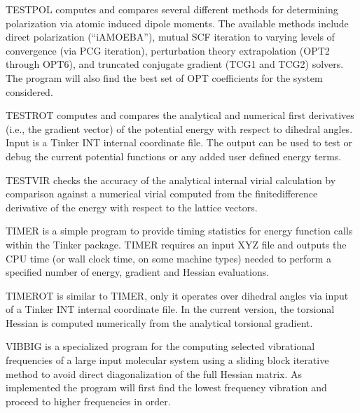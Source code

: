 \documentclass[letterpaper,11pt,english]{sphinxmanual}
\begin{document}
\sphinxAtStartPar
{}

\sphinxAtStartPar
TESTPOL computes and compares several different methods for determining polarization via atomic induced dipole moments. The available methods include direct polarization (“iAMOEBA”), mutual SCF iteration to varying levels of convergence (via PCG iteration), perturbation theory extrapolation (OPT2 through OPT6), and truncated conjugate gradient (TCG1 and TCG2) solvers. The program will also find the best set of OPT coefficients for the system considered.

\sphinxAtStartPar
{}

\sphinxAtStartPar
TESTROT computes and compares the analytical and numerical first derivatives (i.e., the gradient vector) of the potential energy with respect to dihedral angles. Input is a Tinker INT internal coordinate file. The output can be used to test or debug the current potential functions or any added user defined energy terms.

\sphinxAtStartPar
{}

\sphinxAtStartPar
TESTVIR checks the accuracy of the analytical internal virial calculation by comparison against a numerical virial computed from the finite\sphinxhyphen{}difference derivative of the energy with respect to the lattice vectors.

\sphinxAtStartPar
{}

\sphinxAtStartPar
TIMER is a simple program to provide timing statistics for energy function calls within the Tinker package. TIMER requires an input XYZ file and outputs the CPU time (or wall clock time, on some machine types) needed to perform a specified number of energy, gradient and Hessian evaluations.

\sphinxAtStartPar
{}

\sphinxAtStartPar
TIMEROT is similar to TIMER, only it operates over dihedral angles via input of a Tinker INT internal coordinate file. In the current version, the torsional Hessian is computed numerically from the analytical torsional gradient.

\sphinxAtStartPar
{}

\sphinxAtStartPar
VIBBIG is a specialized program for the computing selected vibrational frequencies of a large input molecular system using a sliding block iterative method to avoid direct diagonalization of the full Hessian matrix. As implemented the program will first find the lowest frequency vibration and proceed to higher frequencies in order.
\end{document}
